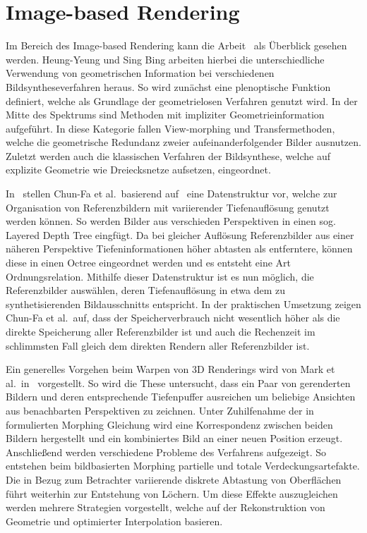 \documentclass[hyperref, beleg, german]{cgvpub}
\begin{document}
\section{Image-based Rendering}

Im Bereich des Image-based Rendering kann die Arbeit~\cite{shum2000review} als
Überblick gesehen werden. Heung-Yeung und Sing Bing arbeiten hierbei die
unterschiedliche Verwendung von geometrischen Information bei verschiedenen
Bildsyntheseverfahren heraus. So wird zunächst eine plenoptische Funktion
definiert, welche als Grundlage der geometrielosen Verfahren genutzt wird. In
der Mitte des Spektrums sind Methoden mit impliziter Geometrieinformation
aufgeführt. In diese Kategorie fallen View-morphing und Transfermethoden, welche
die geometrische Redundanz zweier aufeinanderfolgender Bilder ausnutzen. Zuletzt
werden auch die klassischen Verfahren der Bildsynthese, welche auf explizite
Geometrie wie Dreiecksnetze aufsetzen, eingeordnet.

In~\cite{chang1999ldi} stellen Chun-Fa et al.\ basierend auf~\cite{he1998layered}
eine Datenstruktur vor, welche zur Organisation von Referenzbildern mit
variierender Tiefenauflösung genutzt werden können. So werden Bilder aus
verschieden Perspektiven in einen sog. Layered Depth Tree eingfügt. Da bei
gleicher Auflösung Referenzbilder aus einer näheren Perspektive
Tiefeninformationen höher abtasten als entferntere, können diese in einen Octree
eingeordnet werden und es entsteht eine Art Ordnungsrelation. Mithilfe dieser
Datenstruktur ist es nun möglich, die Referenzbilder auswählen, deren
Tiefenauflösung in etwa dem zu synthetisierenden Bildausschnitts entspricht. In
der praktischen Umsetzung zeigen Chun-Fa et al.\ auf, dass der Speicherverbrauch
nicht wesentlich höher als die direkte Speicherung aller Referenzbilder ist und
auch die Rechenzeit im schlimmsten Fall gleich dem direkten Rendern aller
Referenzbilder ist.

Ein generelles Vorgehen beim Warpen von 3D Renderings wird von Mark et al.\
in~\cite{mark1997post} vorgestellt. So wird die These untersucht, dass ein Paar
von gerenderten Bildern und deren entsprechende Tiefenpuffer ausreichen um
beliebige Ansichten aus benachbarten Perspektiven zu zeichnen. Unter
Zuhilfenahme der in~\cite{mcmillan1995head} formulierten Morphing Gleichung
wird eine Korrespondenz zwischen beiden Bildern hergestellt und ein
kombiniertes Bild an einer neuen Position erzeugt. Anschließend werden
verschiedene Probleme des Verfahrens aufgezeigt. So entstehen beim
bildbasierten Morphing partielle und totale Verdeckungsartefakte. Die in Bezug
zum Betrachter variierende diskrete Abtastung von Oberflächen führt weiterhin
zur Entstehung von Löchern. Um diese Effekte auszugleichen werden mehrere
Strategien vorgestellt, welche auf der Rekonstruktion von Geometrie und
optimierter Interpolation basieren.
\end{document}
